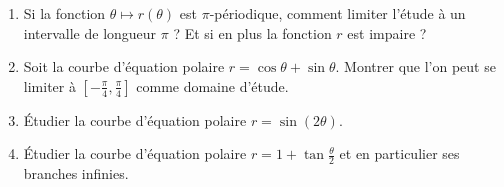 \documentclass[class=report,crop=false]{standalone}
\begin{document}
\begin{miniexercices}
\sauteligne
\begin{enumerate}
  \item Si la fonction $\theta \mapsto r(\theta)$ est
  $\pi$-périodique, comment limiter l'étude à un intervalle
  de longueur $\pi$ ? Et si en plus la fonction $r$ est impaire ?

  \item Soit la courbe d'équation polaire $r=\cos\theta+\sin\theta$.
  Montrer que l'on peut se limiter à $[-\frac{\pi}{4},\frac{\pi}{4}]$
  comme domaine d'étude.

  \item Étudier la courbe d'équation polaire $r = \sin(2\theta)$.

  \item Étudier la courbe d'équation polaire $r = 1+\tan \frac \theta2$ et en particulier ses
  branches infinies.

\end{enumerate}
\end{miniexercices}




\finchapitre
\end{document}
